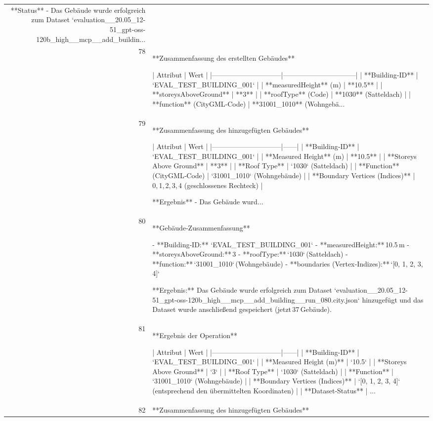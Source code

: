 \documentclass[a4paper,11pt]{article}
\begin{document}
\begin{table}[ht]
\begin{tabular}{r p{12cm}}
**Status**  
- Das Gebäude wurde erfolgreich zum Dataset `evaluation\_\_20.05\_12-51\_gpt-oss-120b\_high\_\_mcp\_\_add\_buildin... \\
78 & **Zusammenfassung des erstellten Gebäudes**

| Attribut                     | Wert                           |
|------------------------------|--------------------------------|
| **Building‑ID**              | `EVAL\_TEST\_BUILDING\_001`       |
| **measuredHeight** (m)       | **10.5**                        |
| **storeysAboveGround**       | **3**                           |
| **roofType** (Code)          | **1030**  (Satteldach)          |
| **function** (CityGML‑Code) | **31001\_1010** (Wohngebä... \\
79 & **Zusammenfassung des hinzugefügten Gebäudes**

| Attribut                     | Wert |
|------------------------------|------|
| **Building‑ID**              | `EVAL\_TEST\_BUILDING\_001` |
| **Measured Height** (m)      | **10.5** |
| **Storeys Above Ground**     | **3** |
| **Roof Type**                | `1030` (Satteldach) |
| **Function** (CityGML‑Code) | `31001\_1010` (Wohngebäude) |
| **Boundary Vertices (Indices)** | 0, 1, 2, 3, 4 (geschlossenes Rechteck) |

**Ergebnis**  
- Das Gebäude wurd... \\
80 & **Gebäude‑Zusammenfassung**

- **Building‑ID:** `EVAL\_TEST\_BUILDING\_001`  
- **measuredHeight:** 10.5 m  
- **storeysAboveGround:** 3  
- **roofType:** `1030` (Satteldach)  
- **function:** `31001\_1010` (Wohngebäude)  
- **boundaries (Vertex‑Indizes):** `[0, 1, 2, 3, 4]`  

**Ergebnis:** Das Gebäude wurde erfolgreich zum Dataset `evaluation\_\_20.05\_12-51\_gpt-oss-120b\_high\_\_mcp\_\_add\_building\_\_run\_080.city.json` hinzugefügt und das Dataset wurde anschließend gespeichert (jetzt 37 Gebäude). \\
81 & **Ergebnis der Operation**

| Attribut                     | Wert |
|------------------------------|------|
| **Building-ID**              | `EVAL\_TEST\_BUILDING\_001` |
| **Measured Height (m)**      | `10.5` |
| **Storeys Above Ground**     | `3` |
| **Roof Type**                | `1030` (Satteldach) |
| **Function**                 | `31001\_1010` (Wohngebäude) |
| **Boundary Vertices (Indices)** | `[0, 1, 2, 3, 4]` (entsprechend den übermittelten Koordinaten) |
| **Dataset‑Status**           | ... \\
82 & **Zusammenfassung des hinzugefügten Gebäudes**


\end{tabular}
\end{table}
\end{document}
